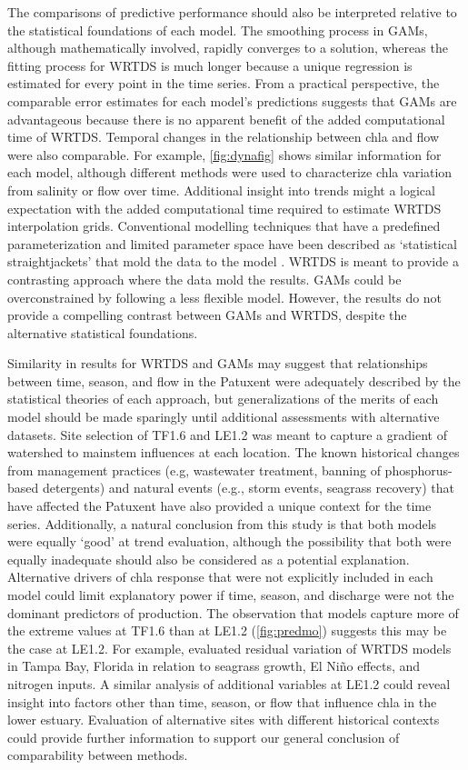\documentclass[letterpaper,12pt,oneside]{article}\usepackage[]{graphicx}\usepackage[]{color}
\begin{document}
The comparisons of predictive performance should also be interpreted relative to the statistical foundations of each model.  The smoothing process in \acp{GAM}, although mathematically involved, rapidly converges to a solution, whereas the fitting process for \ac{WRTDS} is much longer because a unique regression is estimated for every point in the time series.  From a practical perspective, the comparable error estimates for each model's predictions suggests that \acp{GAM} are advantageous because there is no apparent benefit of the added computational time of \ac{WRTDS}.  Temporal changes in the relationship between \ac{chla} and flow were also comparable.  For example, \cref{fig:dynafig} shows similar information for each model, although different methods were used to characterize \ac{chla} variation from salinity or flow over time.  Additional insight into trends might a logical expectation with the added computational time required to estimate \ac{WRTDS} interpolation grids.  Conventional modelling techniques that have a predefined parameterization and limited parameter space have been described as `statistical straightjackets' that mold the data to the model \citep{Hirsch14b}.  \ac{WRTDS} is meant to provide a contrasting approach where the data mold the results. \acp{GAM} could be overconstrained by following a less flexible model.  However, the results do not provide a compelling contrast between \acp{GAM} and \ac{WRTDS}, despite the alternative statistical foundations.  

Similarity in results for \ac{WRTDS} and \acp{GAM} may suggest that relationships between time, season, and flow in the Patuxent were adequately described by the statistical theories of each approach, but generalizations of the merits of each model should be made sparingly until additional assessments with alternative datasets.  Site selection of TF1.6 and LE1.2 was meant to capture a gradient of watershed to mainstem influences at each location.  The known historical changes from management practices (e.g, wastewater treatment, banning of phosphorus-based detergents) and natural events (e.g., storm events, seagrass recovery) that have affected the Patuxent have also provided a unique context for the time series.  Additionally, a natural conclusion from this study is that both models were equally `good' at trend evaluation, although the possibility that both were equally inadequate should also be considered as a potential explanation.  Alternative drivers of \ac{chla} response that were not explicitly included in each model could limit explanatory power if time, season, and discharge were not the dominant predictors of production. The observation that models capture more of the extreme values at TF1.6 than at LE1.2 (\cref{fig:predmo}) suggests this may be the case at LE1.2.  For example, \citet{Beck15} evaluated residual variation of \ac{WRTDS} models in Tampa Bay, Florida in relation to seagrass growth, El Ni\~no effects, and nitrogen inputs.  A similar analysis of additional variables at LE1.2 could reveal insight into factors other than time, season, or flow that influence \ac{chla} in the lower estuary. Evaluation of alternative sites with different historical contexts could provide further information to support our general conclusion of comparability between methods.    
\end{document}
